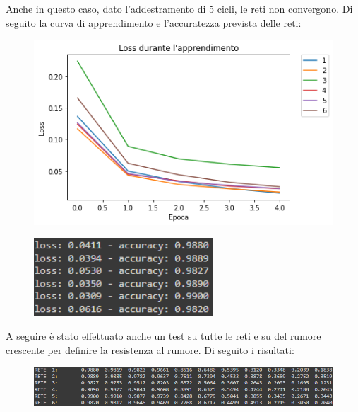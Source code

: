 \documentclass[12pt, a4paper]{article}
\begin{document}
Anche in questo caso, dato l'addestramento di 5 cicli, le reti non convergono. Di seguito la curva di apprendimento e l'accuratezza prevista delle reti:
\begin{figure}[H]
    \centering 
    \includegraphics[width=.9\textwidth]{ConfrontoConvoluzionale.png}
\end{figure}
\begin{figure}[H]
    \centering
    \includegraphics[width=0.6\textwidth]{AccuratezzaConvoluzionale.png}
\end{figure}

A seguire è stato effettuato anche un test su tutte le reti e su del rumore crescente per definire la resistenza al rumore. Di seguito i risultati:
\begin{figure}[H]
    \centering
    \includegraphics[width=\textwidth]{RisultatiRumoreConvoluzionale.png}
\end{figure}

\newpage
\end{document}
